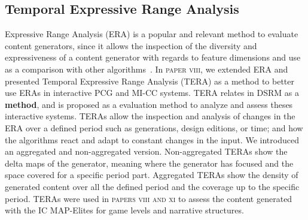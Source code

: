 \subsection{Temporal Expressive Range Analysis}


Expressive Range Analysis (ERA) is a popular and relevant method to evaluate content generators, since it allows the inspection of the diversity and expressiveness of a content generator with regards to feature dimensions and use as a comparison with other algorithms~\cite{shaker_procedural_2016,cook_danesh_2016,horn_comparative_2014}. In \textsc{paper viii}, we extended ERA and presented Temporal Expressive Range Analysis (TERA) as a method to better use ERAs in interactive PCG and MI-CC systems. TERA relates in DSRM as a \textbf{method}, and is proposed as a evaluation method to analyze and assess theses interactive systems. TERAs allow the inspection and analysis of changes in the ERA over a defined period such as generations, design editions, or time; and how the algorithms react and adapt to constant changes in the input. We introduced an aggregated and non-aggregated version. Non-aggregated TERAs show the delta maps of the generator, meaning where the generator has focused and the space covered for a specific period part. Aggregated TERAs show the density of generated content over all the defined period and the coverage up to the specific period. TERAs were used in \textsc{papers viii and xi} to assess the content generated with the IC MAP-Elites for game levels and narrative structures. 



